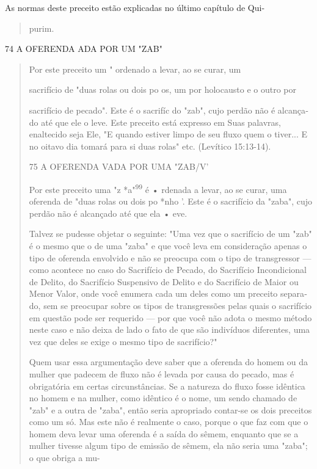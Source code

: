 As normas deste preceito estão explicadas no último capítulo de Qui-

\begin{quote}
purim.
\end{quote}

74 A OFERENDA ADA POR UM "ZAB"

\begin{quote}
Por este preceito um " ordenado a levar, ao se curar, um

sacrifício de "duas rolas ou dois po os, um por holocausto e o outro por

sacrifício de pecado". Este é o sacrifíc do "zab", cujo perdão não é
alcança­do até que ele o leve. Este preceito está expresso em Suas
palavras, enaltecido seja Ele, "E quando estiver limpo de seu fluxo quem
o tiver... E no oitavo dia tomará para si duas rolas" etc. (Levítico
15:13-14).

75 A OFERENDA VADA POR UMA "ZAB/V'

Por este preceito uma "z *a"\textsuperscript{99} é • rdenada a levar, ao
se curar, uma oferenda de "duas rolas ou dois po *nho '. Este é o
sacrifício da "zaba", cu­jo perdão não é alcançado até que ela • eve.

Talvez se pudesse objetar o seguinte: "Uma vez que o sacrifício de um
"zab" é o mesmo que o de uma "zaba" e que você leva em consideração
apenas o tipo de oferenda envolvido e não se preocupa com o tipo de
trans­gressor --- como acontece no caso do Sacrifício de Pecado, do
Sacrifício Incon­dicional de Delito, do Sacrifício Suspensivo de Delito
e do Sacrifício de Maior ou Menor Valor, onde você enumera cada um deles
como um preceito separa­do, sem se preocupar sobre os tipos de
transgressões pelas quais o sacrifício em questão pode ser requerido ---
por que você não adota o mesmo método neste caso e não deixa de lado o
fato de que são indivíduos diferentes, uma vez que deles se exige o
mesmo tipo de sacrifício?"

Quem usar essa argumentação deve saber que a oferenda do homem ou da
mulher que padecem de fluxo não é levada por causa do pecado, mas é
obrigatória em certas circunstâncias. Se a natureza do fluxo fosse
idêntica no homem e na mulher, como idêntico é o nome, um sendo chamado
de "zab" e a outra de "zaba", então seria apropriado contar-se os dois
preceitos como um só. Mas este não é realmente o caso, porque o que faz
com que o homem deva levar uma oferenda é a saída do sêmem, enquanto que
se a mulher tivesse algum tipo de emissão de sêmem, ela não seria uma
"zaba"; o que obriga a mu-
\end{quote}

